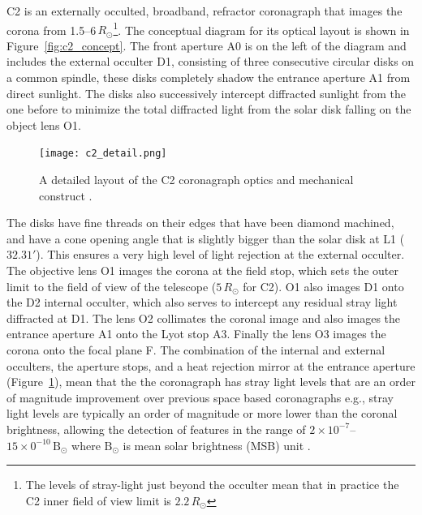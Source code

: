 C2 is an externally occulted, broadband, refractor coronagraph that images the corona from 1.5--6$\,R_{\odot}$\footnote{The levels of stray-light just beyond the occulter mean that in practice the C2 inner field of view limit is $2.2\,R_{\odot}$}. The conceptual diagram for its optical layout is shown in Figure~\ref{fig:c2_concept}. The front aperture A0 is on the left of the diagram and includes the external occulter D1, consisting of three consecutive circular disks on a common spindle, these disks completely shadow the entrance aperture A1 from direct sunlight. The disks also successively intercept diffracted sunlight from the one before to minimize the total diffracted light from the solar disk falling on the object lens O1. 
\begin{figure}[!t]
\begin{center}
\texttt{[image: c2\_detail.png]}
\caption[The LASCO C2 coronagraph detail]{A detailed layout of the C2 coronagraph optics and mechanical construct \citep{bru95}.}
\label{fig:c2_detail}
\end{center}
\end{figure}
The disks have fine threads on their edges that have been diamond machined, and have a cone opening angle that is slightly bigger than the solar disk at L1 ($32.31'$). This ensures a very high level of light rejection at the external occulter. The objective lens O1 images the corona at the field stop, which sets the outer limit to the field of view of the telescope ($5\,R_{\odot}$ for C2). O1 also images D1 onto the D2 internal occulter, which also serves to intercept any residual stray light diffracted at D1. The lens O2 collimates the coronal image and also images the entrance aperture A1 onto the Lyot stop A3. Finally the lens O3 images the corona onto the focal plane F. The combination of the internal and external occulters, the aperture stops, and a heat rejection mirror at the entrance aperture (Figure~\ref{fig:c2_detail}), mean that the the coronagraph has stray light levels that are an order of magnitude improvement over previous space based coronagraphs e.g., stray light levels are typically an order of magnitude or more lower than the coronal brightness, allowing the detection of features in the range of $2\times10^{-7}$--$15\times0^{-10}\,\mathrm{B}_{\odot}$ where $\mathrm{B}_{\odot}$ is mean solar brightness (MSB) unit \citep{bru95}.

